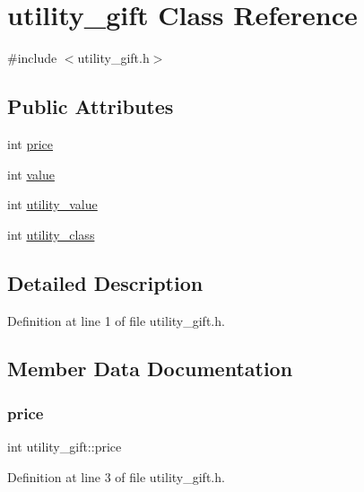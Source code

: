 \hypertarget{classutility__gift}{}\section{utility\+\_\+gift Class Reference}
\label{classutility__gift}


{\ttfamily \#include $<$utility\+\_\+gift.\+h$>$}

\subsection*{Public Attributes}
\begin{DoxyCompactItemize}
\item 
int \hyperlink{classutility__gift_a23497b139174a81d6fd30682cfa879a5}{price}
\item 
int \hyperlink{classutility__gift_adcb888522cd06ce71f7f88c13fc35daf}{value}
\item 
int \hyperlink{classutility__gift_a344f2664f906b148f7d59ca0c3f37f80}{utility\+\_\+value}
\item 
int \hyperlink{classutility__gift_aed6d0e4ab2c134bd1d219ce1d1d3b9ea}{utility\+\_\+class}
\end{DoxyCompactItemize}


\subsection{Detailed Description}


Definition at line 1 of file utility\+\_\+gift.\+h.



\subsection{Member Data Documentation}
\mbox{\label{classutility__gift_a23497b139174a81d6fd30682cfa879a5}} 
\subsubsection{\texorpdfstring{price}{price}}
{\footnotesize\ttfamily int utility\+\_\+gift\+::price}



Definition at line 3 of file utility\+\_\+gift.\+h.

\mbox{\label{classutility__gift_aed6d0e4ab2c134bd1d219ce1d1d3b9ea}} 
